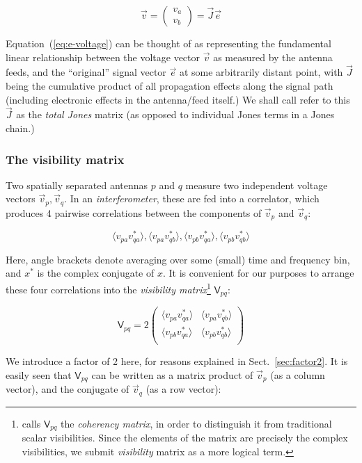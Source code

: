 \documentclass[]{aa}
\newcommand{\matrixtt}[4]{\left( \begin{array}{cc}#1&#2\\#3&#4\\\end{array} \right)}
\newcommand{\jones}[2]{\vec {#1}_{#2}}
\newcommand{\coh}[2]{\mathsf{{#1}}_{{#2}}}
\begin{document}
\begin{equation}\label{eq:e-voltage}
\vec v = \left( \begin{array}{c}v_a\\v_b\end{array} \right) = \jones{J}{} \vec e
\end{equation}
 
Equation~(\ref{eq:e-voltage}) can be thought of as representing the fundamental linear relationship between the voltage vector $\vec v$ as measured by the antenna feeds, and the ``original'' signal vector $\vec e$ at some arbitrarily distant point, with $\jones{J}{}$ being the cumulative product of all propagation effects along the signal path (including electronic effects in the antenna/feed itself.) We shall call refer to this $\jones{J}{}$ as the {\em total Jones} matrix (as opposed to individual Jones terms in a Jones chain.) 

\subsubsection{The visibility matrix}

Two spatially separated antennas $p$ and $q$ measure two independent voltage vectors $\vec v_p,\vec v_q$. In an {\em interferometer}, these are fed into a correlator, which produces 4 pairwise correlations between the components of $\vec v_p$ and $\vec v_q$:

    \begin{equation}\label{eq:correlation}
    \langle v_{pa}v^*_{qa}\rangle, \langle v_{pa}v^*_{qb}\rangle, 
    \langle v_{pb}v^*_{qa}\rangle, \langle v_{pb}v^*_{qb}\rangle
    \end{equation}

Here, angle brackets denote averaging over some (small) time and frequency bin, and $x^*$ is the complex conjugate of $x$.  It is convenient for our purposes to arrange these four correlations into the {\em visibility matrix\/}\footnote{\citet{ME4} calls $\coh{V}{pq}$ the {\em coherency matrix}, in order to distinguish it from traditional scalar visibilities. Since the elements of the matrix are precisely the complex visibilities, we submit {\em visibility} matrix as a more logical term.} $\coh{V}{pq}$:

    \[
    \coh{V}{pq} = 2 \matrixtt{\langle v_{pa}v^*_{qa}\rangle}{\langle v_{pa}v^*_{qb}\rangle}{\langle v_{pb}v^*_{qa}\rangle}{\langle v_{pb}v^*_{qb}\rangle}
    \]

We introduce a factor of 2 here, for reasons explained in Sect.~\ref{sec:factor2}. It is easily seen that $\coh{V}{pq}$ can be written as a matrix product of $\vec v_p$ (as a column vector), and the conjugate of $\vec v_q$ (as a row vector):
\end{document}
